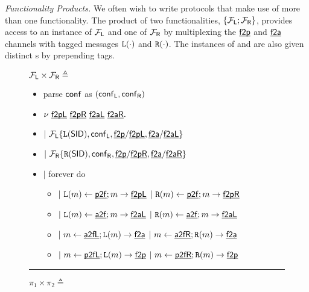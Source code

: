 \emph{Functionality Products.}
We often wish to write protocols that make use of more than one functionality. The product of two functionalities, $\{\F{L};\F{R}\}$, provides access to an instance of $\F{L}$ and one of $\F{R}$ by multiplexing the $\chan{f2p}$ and $\chan{f2a}$ channels with tagged messages $\mtt{L}(\cdot)$ and $\mtt{R}(\cdot)$. The instances of  and  are also given distinct s by prepending tags.

\begin{figure}[h!]
\begin{boxedminipage}{\columnwidth}
\begin{centering}
$\F{L} \times \F{R} \triangleq$
\end{centering}
\begin{small}
\begin{itemize}[leftmargin=2mm]
\item[] parse $\msf{conf}$ as $(\msf{conf}_\msf{L},\msf{conf}_\msf{R})$
\item[] $\nu  ~\chan{f2pL}~\chan{f2pR}~\chan{f2aL}~\chan{f2aR}.$
\item[] $|~ \F{L}\{\mtt{L}(\msf{SID}),\msf{conf}_\msf{L}, \chan{f2p}/\chan{f2pL}, \chan{f2a}/\chan{f2aL} \}$
\item[] $|~ \F{R}\{\mtt{R}(\msf{SID}),\msf{conf}_\msf{R}, \chan{f2p}/\chan{f2pR}, \chan{f2a}/\chan{f2aR} \}$
\item[] $|$ forever do 
  \begin{itemize}[leftmargin=2mm]
  \item[] $|~ \mtt{L}(m)\leftarrow \chan{p2f}; m \rightarrow \chan{f2pL}$
  \qquad  $|~ \mtt{R}(m)\leftarrow \chan{p2f}; m \rightarrow \chan{f2pR}$
  \item[] $|~ \mtt{L}(m)\leftarrow \chan{a2f}; m \rightarrow \chan{f2aL}$
  \qquad  $|~ \mtt{R}(m)\leftarrow \chan{a2f}; m \rightarrow \chan{f2aL}$
  \item[] $|~m\leftarrow\chan{a2fL};\mtt{L}(m) \rightarrow \chan{f2a}$
  \qquad  $|~m\leftarrow\chan{a2fR};\mtt{R}(m) \rightarrow \chan{f2a}$
  \item[] $|~m\leftarrow\chan{p2fL};\mtt{L}(m) \rightarrow \chan{f2p}$
  \qquad  $|~m\leftarrow\chan{p2fR};\mtt{R}(m) \rightarrow \chan{f2p}$
  \end{itemize}
\end{itemize}
\end{small}
\hrule
\begin{centering}
$\pi_1 \times \pi_2 \triangleq$
\end{centering}
\begin{small}

\end{small}
\end{boxedminipage}
\end{figure}
